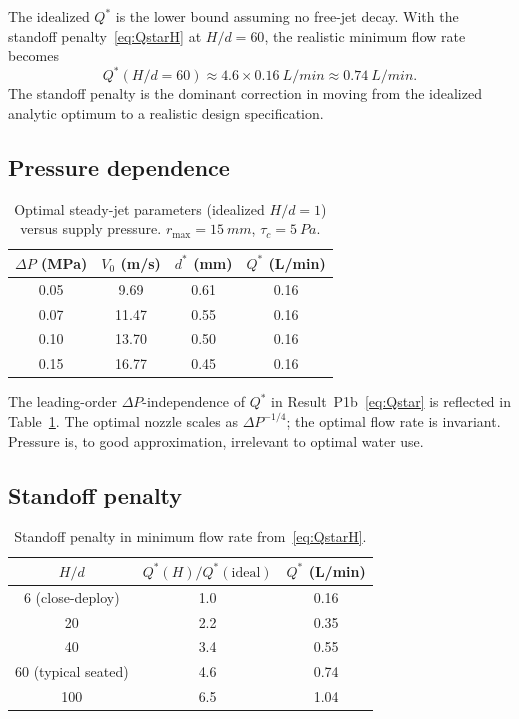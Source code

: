 \documentclass[aps,prfluids,reprint,amsmath,amssymb,floatfix]{revtex4-2}
\begin{document}
The idealized $Q^*$ is the lower bound assuming no free-jet decay. With
the standoff penalty~\eqref{eq:QstarH} at $H/d = 60$, the realistic
minimum flow rate becomes
\[
  Q^*(H/d = 60) \approx 4.6 \times \SI{0.16}{L/min} \approx \SI{0.74}{L/min}.
\]
The standoff penalty is the dominant correction in moving from the
idealized analytic optimum to a realistic design specification.

\subsection{Pressure dependence}

\begin{table}[h]
\centering
\caption{Optimal steady-jet parameters (idealized $H/d = 1$) versus
supply pressure. $r_\mathrm{max} = \SI{15}{mm}$, $\tau_c = \SI{5}{Pa}$.}
\label{tab:pressure}
\begin{tabular}{cccc}
\toprule
$\Delta P$ (MPa) & $V_0$ (m/s) & $d^*$ (mm) & $Q^*$ (L/min) \\
\midrule
0.05 & 9.69  & 0.61 & 0.16 \\
0.07 & 11.47 & 0.55 & 0.16 \\
0.10 & 13.70 & 0.50 & 0.16 \\
0.15 & 16.77 & 0.45 & 0.16 \\
\bottomrule
\end{tabular}
\end{table}

The leading-order $\Delta P$-independence of $Q^*$ in
Result~P1b~\eqref{eq:Qstar} is reflected in Table~\ref{tab:pressure}.
The optimal nozzle scales as $\Delta P^{-1/4}$; the optimal flow rate
is invariant. Pressure is, to good approximation, irrelevant to optimal
water use.

\subsection{Standoff penalty}

\begin{table}[h]
\centering
\caption{Standoff penalty in minimum flow rate from~\eqref{eq:QstarH}.}
\label{tab:standoff}
\begin{tabular}{ccc}
\toprule
$H/d$ & $Q^*(H)/Q^*(\text{ideal})$ & $Q^*$ (L/min) \\
\midrule
6 (close-deploy) & 1.0 & 0.16 \\
20 & 2.2 & 0.35 \\
40 & 3.4 & 0.55 \\
60 (typical seated) & 4.6 & 0.74 \\
100 & 6.5 & 1.04 \\
\bottomrule
\end{tabular}
\end{table}
\end{document}
